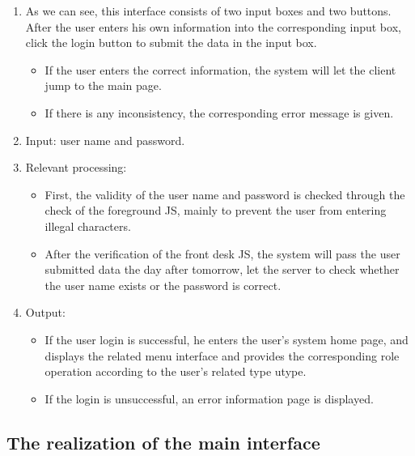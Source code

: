 \begin{enumerate}
    \item As we can see, this interface consists of two input boxes and two buttons. After the user enters his own information into the corresponding input box, click the login button to submit the data in the input box. 
    \begin{itemize}
        \item If the user enters the correct information, the system will let the client jump to the main page. 
        \item If there is any inconsistency, the corresponding error message is given.
    \end{itemize}
    \item Input: user name and password.
    \item Relevant processing: 
        \begin{itemize}
            \item First, the validity of the user name and password is checked through the check of the foreground JS, mainly to prevent the user from entering illegal characters. 
            \item After the verification of the front desk JS, the system will pass the user submitted data the day after tomorrow, let the server to check whether the user name exists or the password is correct.
        \end{itemize}
    \item Output: 
    \begin{itemize}
        \item If the user login is successful, he enters the user's system home page, and displays the related menu interface and provides the corresponding role operation according to the user's related type utype.
        \item If the login is unsuccessful, an error information page is displayed.
    \end{itemize} 
\end{enumerate}
\subsection{The realization of the main interface}
